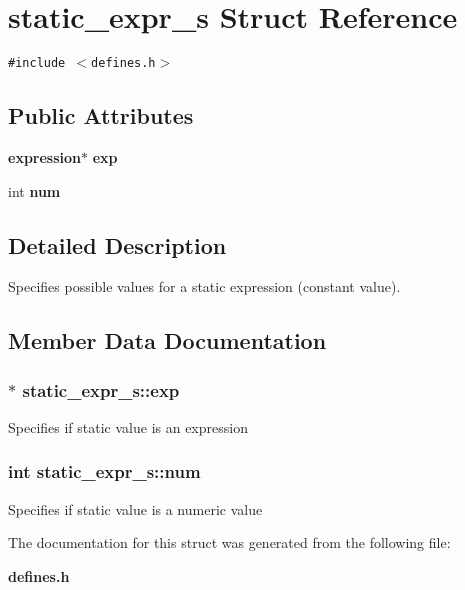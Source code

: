 \section{static\_\-expr\_\-s  Struct Reference}
\label{structstatic__expr__s}
{\tt \#include $<$defines.h$>$}

\subsection*{Public Attributes}
\begin{CompactItemize}
\item 
{\bf expression}$\ast$ {\bf exp}
\item 
int {\bf num}
\end{CompactItemize}


\subsection{Detailed Description}
Specifies possible values for a static expression (constant value). 



\subsection{Member Data Documentation}
\subsubsection{ $\ast$ static\_\-expr\_\-s::exp}\label{structstatic__expr__s_m0}


Specifies if static value is an expression 
\subsubsection{\setlength{\rightskip}{0pt plus 5cm}int static\_\-expr\_\-s::num}\label{structstatic__expr__s_m1}


Specifies if static value is a numeric value 

The documentation for this struct was generated from the following file:\begin{CompactItemize}
\item 
{\bf defines.h}\end{CompactItemize}
